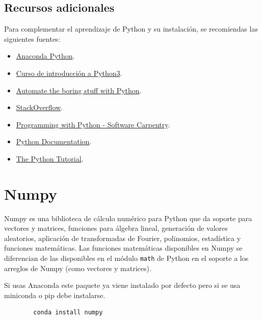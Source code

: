 \subsection{Recursos adicionales}

Para complementar el aprendizaje de Python y su instalación, se
recomiendas las siguientes fuentes:

\begin{itemize}
\item
  \href{https://docs.anaconda.com/anaconda/install/}{Anaconda Python}.
\item
  \href{https://github.com/saint-germain/Python3Espanol}{Curso de
  introducción a Python3}.
\item
  \href{https://automatetheboringstuff.com/}{Automate the boring stuff
  with Python}.
\item
  \href{https://stackoverflow.com/questions/tagged/python}{StackOverflow}.
\item
  \href{http://swcarpentry.github.io/python-novice-inflammation/}{Programming
  with Python - Software Carpentry}.
\item
  \href{https://docs.python.org/3.6/}{Python Documentation}.
\item
  \href{https://docs.python.org/3/tutorial/}{The Python Tutorial}.
\end{itemize}

\section{Numpy}

Numpy es una biblioteca de cálculo numérico para Python que da soporte
para vectores y matrices, funciones para álgebra lineal, generación de
valores aleatorios, aplicación de transformadas de Fourier, polinomios,
estadística y funciones matemáticas. Las funciones matemáticas
disponibles en Numpy se diferencian de las disponibles en el módulo
\texttt{math} de Python en el soporte a los arreglos de Numpy (como
vectores y matrices).

Si usas Anaconda este paquete ya viene instalado por defecto pero si se
usa miniconda o pip debe instalarse.

\begin{listing}[H]
    \begin{verbatim}
        conda install numpy 
    \end{verbatim}
\end{listing}

